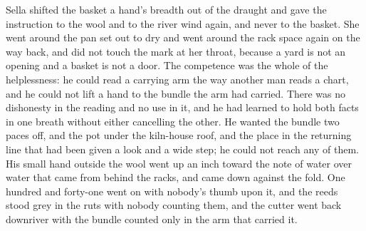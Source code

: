Sella shifted the basket a hand's breadth out of the draught and gave the instruction to the wool and to the river wind again, and never to the basket. She went around the pan set out to dry and went around the rack space again on the way back, and did not touch the mark at her throat, because a yard is not an opening and a basket is not a door. The competence was the whole of the helplessness: he could read a carrying arm the way another man reads a chart, and he could not lift a hand to the bundle the arm had carried. There was no dishonesty in the reading and no use in it, and he had learned to hold both facts in one breath without either cancelling the other. He wanted the bundle two paces off, and the pot under the kiln-house roof, and the place in the returning line that had been given a look and a wide step; he could not reach any of them. His small hand outside the wool went up an inch toward the note of water over water that came from behind the racks, and came down against the fold. One hundred and forty-one went on with nobody's thumb upon it, and the reeds stood grey in the ruts with nobody counting them, and the cutter went back downriver with the bundle counted only in the arm that carried it.
